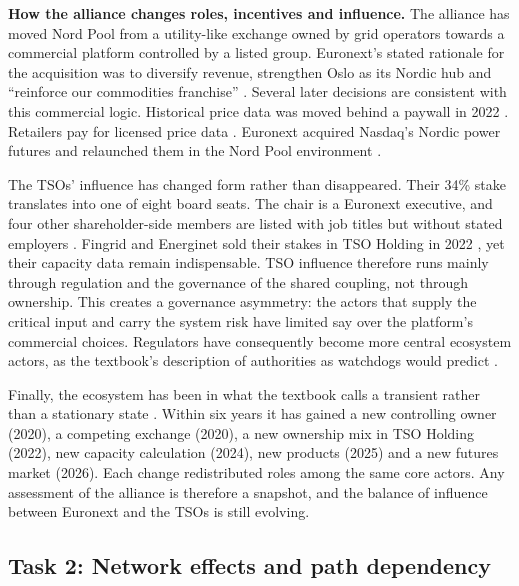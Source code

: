 \textbf{How the alliance changes roles, incentives and influence.} The alliance has moved Nord Pool from a utility-like exchange owned by grid operators towards a commercial platform controlled by a listed group. Euronext's stated rationale for the acquisition was to diversify revenue, strengthen Oslo as its Nordic hub and ``reinforce our commodities franchise'' \citep{Euronext2020}. Several later decisions are consistent with this commercial logic. Historical price data was moved behind a paywall in 2022 \citep{ERR2022}. Retailers pay for licensed price data \citep{NPData}. Euronext acquired Nasdaq's Nordic power futures and relaunched them in the Nord Pool environment \citep{FOW2025,Euronext2026}.

The TSOs' influence has changed form rather than disappeared. Their 34\% stake translates into one of eight board seats. The chair is a Euronext executive, and four other shareholder-side members are listed with job titles but without stated employers \citep{NPBoard}. Fingrid and Energinet sold their stakes in TSO Holding in 2022 \citep{EPSOG2022}, yet their capacity data remain indispensable. TSO influence therefore runs mainly through regulation and the governance of the shared coupling, not through ownership. This creates a governance asymmetry: the actors that supply the critical input and carry the system risk have limited say over the platform's commercial choices. Regulators have consequently become more central ecosystem actors, as the textbook's description of authorities as watchdogs would predict \citep[Sect.~4.7]{OverbyAudestad2021}.

Finally, the ecosystem has been in what the textbook calls a transient rather than a stationary state \citep[Sect.~4.2]{OverbyAudestad2021}. Within six years it has gained a new controlling owner (2020), a competing exchange (2020), a new ownership mix in TSO Holding (2022), new capacity calculation (2024), new products (2025) and a new futures market (2026). Each change redistributed roles among the same core actors. Any assessment of the alliance is therefore a snapshot, and the balance of influence between Euronext and the TSOs is still evolving.

\subsection{Task 2: Network effects and path dependency}
\label{sec:t2}

